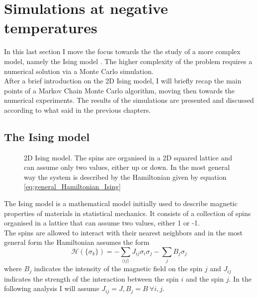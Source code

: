 \chapter{Simulations at negative temperatures}
\label{ch:ising}

In this last section I move the focus towards the the study of a more complex model, namely the Ising model \cite{ising}. The higher complexity of the problem requires a numerical solution
via a Monte Carlo simulation. \\
After a brief introduction on the 2D Ising model, I will briefly recap the main points of a Markov Chain Monte Carlo algorithm, moving then towards the numerical experiments. The results of the
simulations are presented and discussed according to what said in the previous chapters. \\
\section{The Ising model}
\begin{figure}[htbp]
    \centering
    \caption{2D Ising model. The spins are organised in a 2D squared lattice and can assume only two values, either up or down. In the most general way the system is described by the Hamiltonian given by equation \ref{eq:general_Hamiltonian_Ising}}
    \label{fig:IsingLattice}
\end{figure}
The Ising model is a mathematical model initially used to describe magnetic properties of materials in statistical mechanics. It consists of a collection of spins 
organised in a lattice that can assume two values, either 1 or -1. \\
The spins are allowed to interact with their nearest neighbors and in the most general form the Hamiltonian assumes the form
\begin{equation}
    \mathcal{H}(\{\sigma_k\}) = -\sum_{\langle i j\rangle} J_{i j} \sigma_{i} \sigma_{j} - \sum_{j} B_j\sigma_{j}
    \label{eq:general_Hamiltonian_Ising}
\end{equation}
where $B_j$ indicates the intensity of the magnetic field on the spin $j$ and $J_{ij}$ indicates the strength of the interaction between the spin $i$ and the spin $j$.
In the following analysis I will assume $J_{ij} = J, B_j = B \ \forall i,j$. \\
